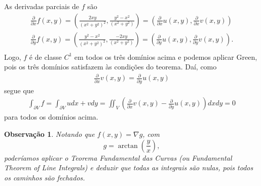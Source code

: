 \documentclass[12pt,a4paper]{article}
\newtheorem*{obs}{Observação}
\begin{document}
\begin{enumerate}
\begin{figure}[h!]
\begin{subfigure}{0.25\textwidth}
		\end{subfigure}
	\end{figure}
	\par As derivadas parciais de $f$ são
	\begin{align*}
	\frac{\partial}{\partial x}f(x,y) = \left( \frac{2xy}{(x^2+y^2)^2}, \frac{y^2-x^2}{(x^2 + y^2)} \right) = \left( \frac{\partial}{\partial x}u(x,y), \frac{\partial}{\partial x}v(x,y) \right) \\ 
	\frac{\partial}{\partial y}f(x,y) = \left( \frac{y^2-x^2}{(x^2+y^2)^2}, \frac{-2xy}{(x^2 + y^2)} \right) = \left( \frac{\partial}{\partial y}u(x,y), \frac{\partial}{\partial y}v(x,y) \right). \\ 
	\end{align*} 
	Logo, $f$ é de classe $C^1$ em todos os três domínios acima e podemos aplicar Green, pois os três domínios satisfazem às condições do teorema. Daí, como 
	\begin{align*}
	\frac{\partial}{\partial x}v(x,y) = \frac{\partial}{\partial y}u(x,y) 
	\end{align*}
	segue que
	\begin{align*}
	\int_{\partial V} f = \int_{\partial V} udx + vdy = \iint_{V} \left( \frac{\partial}{\partial x}v(x,y)- \frac{\partial}{\partial y}u(x,y) \right)dxdy = 0
	\end{align*}
	para todos os domínios acima.
	\begin{obs}
		Notando que $f(x,y) = \nabla g$, com $$ g = \arctan\left( \frac{y}{x} \right), $$ poderíamos aplicar o Teorema Fundamental das Curvas (ou Fundamental Theorem of Line Integrals) e deduzir que todas as integrais são nulas, pois todos os caminhos são fechados.
	\end{obs}


\end{enumerate}
\end{document}
